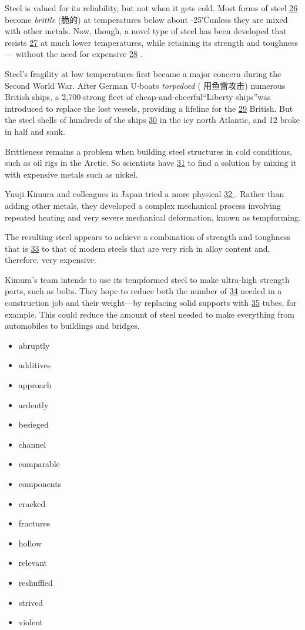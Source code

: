\documentclass[UTF8,11pt]{ctexart}
\begin{document}
Steel is valued for its reliability, but not when it gets cold. Most forms of steel \uline{26} become\textit{ brittle} (脆的) at temperatures below about -25℃unless they are mixed with other metals. Now, though, a novel type of steel has been developed that resists \uline{27} at much lower temperatures, while retaining its strength and toughness — without the need for expensive \uline{28} .


Steel’s fragility at low temperatures first became a major concern during the Second World War. After German U-boats \textit{torpedoed} ( 用鱼雷攻击) numerous British ships, a 2,700-strong fleet of cheap-and-cheerful“Liberty ships”was introduced to replace the lost vessels, providing a lifeline for the \uline{29} British. But the steel shells of hundreds of the ships \uline{30} in the icy north Atlantic, and 12 broke in half and sank.


Brittleness remains a problem when building steel structures in cold conditions, such as oil rigs in the Arctic. So scientists have \uline{31} to find a solution by mixing it with expensive metals such as nickel.


Yuuji Kimura and colleagues in Japan tried a more physical \uline{32 }. Rather than adding other metals, they developed a complex mechanical process involving repeated heating and very severe mechanical deformation, known as tempforming.


The resulting steel appears to achieve a combination of strength and toughness that is \uline{33} to that of modem steels that are very rich in alloy content and, therefore, very expensive.


Kimura’s team intends to use its tempformed steel to make ultra-high strength parts, such as bolts. They hope to reduce both the number of \uline{34} needed in a construction job and their weight—by replacing solid supports with \uline{35} tubes, for example. This could reduce the amount of steel needed to make everything from automobiles to buildings and bridges.


\begin{itemize}[leftmargin=2em,itemsep=.2em,topsep=.4em]\item[A.] abruptly
\item[B.] additives
\item[C.] approach
\item[D.] ardently
\item[E.] besieged
\item[F.] channel
\item[G.] comparable
\item[H.] components
\item[I.] cracked
\item[J.] fractures
\item[K.] hollow
\item[L.] relevant
\item[M.] reshuffled
\item[N.] strived
\item[O.] violent
\end{itemize}
\end{document}
